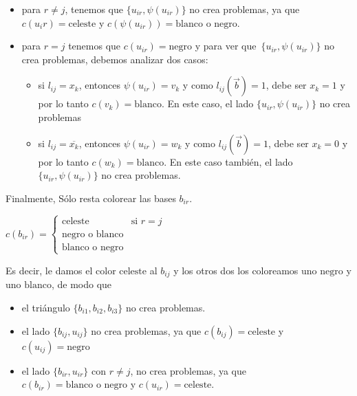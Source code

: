\documentclass[10pt,a4paper]{article}
\begin{document}
\begin{itemize}

	\item para $r \neq j$, tenemos que $\{u_{ir},\psi(u_{ir})\}$ no crea problemas, ya que $c(u_ir) = \text{celeste}$ y $c(\psi(u_{ir})) = \text{blanco o negro}$.
	\item para $r= j$ tenemos que $c(u_{ir}) = \text{negro}$ y para ver que $\{u_{ir},\psi(u_{ir})\}$ no crea problemas, debemos analizar dos casos:
	\begin{itemize}

		\item si $l_{ij} = x_k$, entonces $\psi(u_{ir}) = v_k$ y como $l_{ij}(\overrightarrow{b}) = 1$, debe ser $x_k = 1$ y por lo tanto $c(v_k) = \text{blanco}$. En este caso, el lado $\{u_{ir},\psi(u_{ir})\}$ no crea problemas
		\item si $l_{ij} = \overline{x_k}$, entonces $\psi(u_{ir}) = w_k$ y como $l_{ij}(\overrightarrow{b}) = 1$, debe ser $x_k = 0$ y por lo tanto $c(w_k) = \text{blanco}$. En este caso también, el lado $\{u_{ir},\psi(u_{ir})\}$ no crea problemas.
	\end{itemize}
	
\end{itemize}

Finalmente, Sólo resta colorear las bases $b_{ir}$.

\begin{center}
$c(b_{ir}) = \begin{cases} \text{celeste} & \text{si } r = j\\ \text{negro o blanco}\\ \text{blanco o negro} \end{cases}$
\end{center}

Es decir, le damos el color $\text{celeste}$ al $b_{ij}$ y los otros dos los coloreamos uno $\text{negro}$ y uno $\text{blanco}$, de modo que

\begin{itemize}

	\item el triángulo $\{b_{i1}, b_{i2}, b_{i3}\}$ no crea problemas.
	\item el lado $\{b_{ij}, u_{ij}\}$ no crea problemas, ya que $c(b_{ij}) = \text{celeste}$ y $c(u_{ij}) = \text{negro}$
	\item el lado $\{b_{ir}, u_{ir}\}$ con $r \neq j$, no crea problemas, ya que $c(b_{ir}) = \text{blanco o negro}$ y $c(u_{ir}) = \text{celeste}$.
\end{itemize}


\end{document}
